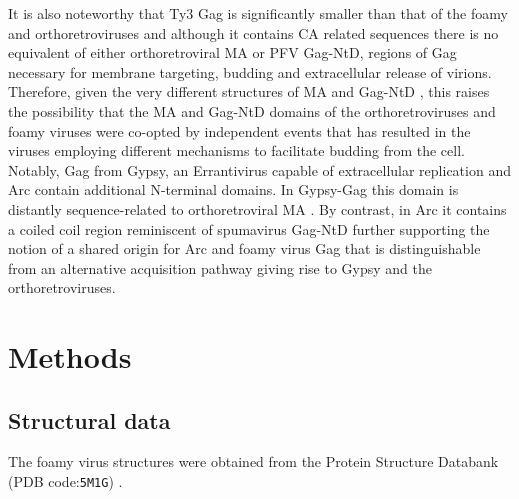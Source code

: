 \documentclass{bmcart}
\begin{document}
It is also noteworthy that Ty3 Gag is significantly smaller than that of the foamy and orthoretroviruses and
although it contains CA related sequences there is no equivalent of either orthoretroviral MA or PFV Gag-NtD,
regions of Gag necessary for membrane targeting, budding and extracellular release of virions. Therefore, given
the very different structures of MA \cite{HillCPet96,PrchalJet12,RaoZet95,RiffelNet02} and Gag-NtD
\cite{GoldstoneDCet13}, this raises the possibility that the MA and Gag-NtD domains of the orthoretroviruses 
and foamy viruses were co-opted by independent events that has resulted in the viruses employing different 
mechanisms to facilitate budding from the cell. Notably, Gag from Gypsy, an Errantivirus capable of extracellular 
replication \cite{SongSUet94} and Arc contain additional N-terminal domains. In Gypsy-Gag this domain is distantly 
sequence-related to orthoretroviral MA \cite{CampillosMet06}. By contrast, in Arc it contains a coiled coil region
\cite{ZhangWet15} reminiscent of spumavirus Gag-NtD \cite{GoldstoneDCet13,TobalyJet01} further supporting the 
notion of a shared origin for Arc and foamy virus Gag that is distinguishable from an alternative acquisition 
pathway giving rise to Gypsy and the orthoretroviruses.


\section*{Methods}

\subsection*{Structural data}

The foamy virus structures were obtained from the Protein Structure Databank
(PDB code:{\tt 5M1G}) \cite{BallNJet16}.
\end{document}
